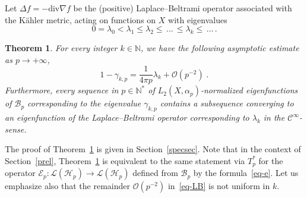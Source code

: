 \documentclass[11pt]{article}
\newtheorem{theo}{Theorem}[section]
\theoremstyle{definition}
\numberwithin{equation}{section}
\numberwithin{figure}{section}
\numberwithin{table}{section}
\newcommand{\N}{{\mathbb{N}}}
\newcommand{\cB}{{\mathcal{B}}}
\newcommand{\cE}{{\mathcal{E}}}
\newcommand{\cH}{{\mathcal{H}}}
\newcommand{\bigo}{\mathcal{O}}
\renewcommand\leq {\leqslant}
\newcommand\< {\mathcal{h}}
\renewcommand\> {\mathcal{i}}
\newcommand*\cC{\mathscr{C}}
\newcommand*\cL{\mathscr{L}}
\begin{document}
Let $\Delta f= -\text{div} \nabla f$ be the (positive) Laplace--Beltrami operator associated with the K\"ahler metric, acting on functions on $X$ with eigenvalues
\begin{equation}\label{evLB}
0=\lambda_0 < \lambda_1 \leq\lambda_2\leq \,\dots\,\leq\lambda_k\leq\,\dots\,.
\end{equation}

\begin{theo}\label{thm-quant}
For every integer $k\in\N$, we have the following asymptotic estimate as $p\to +\infty$,
\begin{equation}\label{eq-LB}
1-\gamma_{k,p} =\frac{1}{4\pi p}\lambda_k + \bigo\left(p^{-2}\right)\;.
\end{equation}
Furthermore, every sequence in $p\in\N^*$ of $L_2(X,\alpha_p)$-normalized eigenfunctions of $\cB_p$ corresponding to the eigenvalue $\gamma_{k,p}$ contains a subsequence converging to an eigenfunction of the Laplace--Beltrami operator corresponding to $\lambda_k$ in the $\cC^\infty$-sense.
\end{theo}

The proof of Theorem~\ref{thm-quant} is given in Section~\ref{specsec}. Note that in the context of Section~\ref{prel}, Theorem~\ref{thm-quant} is equivalent to the same statement via $T^*_p$ for the operator $\cE_p:\cL(\cH_p)\to\cL(\cH_p)$ defined from $\cB_p$ by the formula~\eqref{eq-e}. Let us emphasize also that the remainder $\bigo(p^{-2})$ in~\eqref{eq-LB} is not uniform in $k$.

\end{document}
